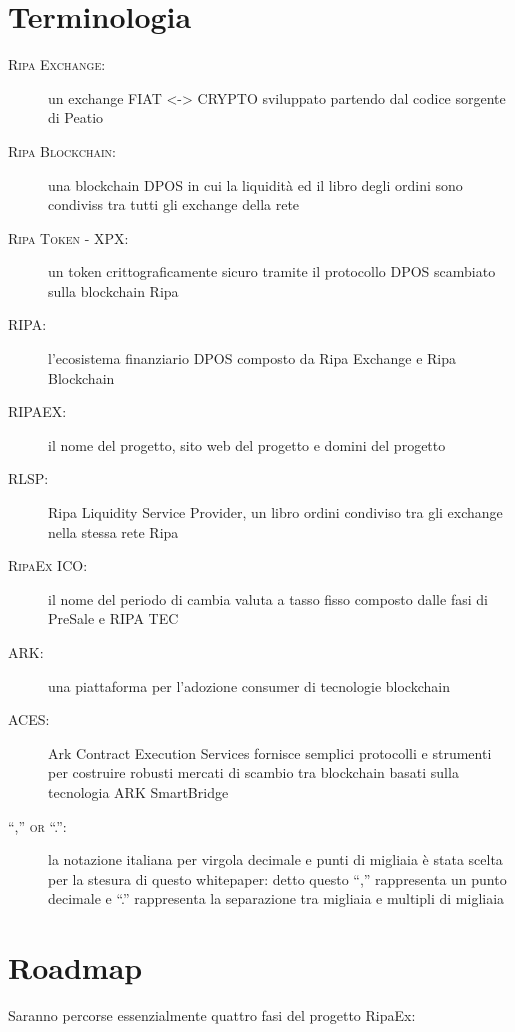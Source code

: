 \documentclass[11pt,fleqn,oneside]{book} %
\begin{document}
\section{Terminologia}
\begin{description}
	\item[\textsc{Ripa Exchange:}] un exchange FIAT <-> CRYPTO sviluppato partendo dal codice sorgente di Peatio \cite{peatio}
	\item[\textsc{Ripa Blockchain:}] una blockchain DPOS in cui la liquidità ed il libro degli ordini sono condiviss tra tutti gli exchange della rete
	\item[\textsc{Ripa Token - XPX:}] un token crittograficamente sicuro tramite il protocollo DPOS scambiato sulla blockchain Ripa 
	\item[\textsc{RIPA:}] l'ecosistema finanziario DPOS composto da Ripa Exchange e Ripa Blockchain
	\item[\textsc{RIPAEX:}] il nome del progetto, sito web del progetto e domini del progetto
	\item[\textsc{RLSP:}] Ripa Liquidity Service Provider, un libro ordini condiviso tra gli exchange nella stessa rete Ripa
	\item[\textsc{RipaEx ICO:}] il nome del periodo di cambia valuta a tasso fisso composto dalle fasi di PreSale e RIPA TEC	
	\item[\textsc{ARK:}] una piattaforma per l'adozione consumer di tecnologie blockchain \cite{ark}
	\item[\textsc{ACES:}] Ark Contract Execution Services \cite{aces} fornisce semplici protocolli e strumenti per costruire robusti
	mercati di scambio tra blockchain basati sulla tecnologia ARK SmartBridge
	\item[\textsc{“,” or “.”:}] la notazione italiana per virgola decimale e punti di migliaia è stata scelta per la stesura di questo 
	whitepaper: detto questo “,” rappresenta un punto decimale e “.” rappresenta la separazione tra migliaia e multipli di migliaia 
\end{description}

\pagebreak
\section{Roadmap}
Saranno percorse essenzialmente quattro fasi del progetto RipaEx:\\
\end{document}
